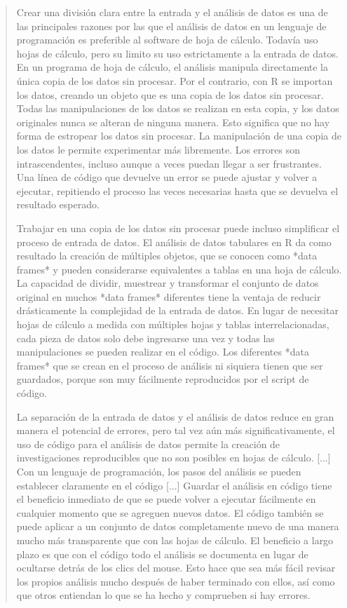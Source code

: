 \documentclass[
  letterpaper,
]{scrbook}
\begin{document}
\begin{quote}
Crear una división clara entre la entrada y el análisis de datos es una de las principales razones por las que el análisis de datos en un lenguaje de programación es preferible al software de hoja de cálculo. Todavía uso hojas de cálculo, pero su limito su uso estrictamente a la entrada de datos. En un programa de hoja de cálculo, el análisis manipula directamente la única copia de los datos sin procesar. Por el contrario, con R se importan los datos, creando un objeto que es una copia de los datos sin procesar. Todas las manipulaciones de los datos se realizan en esta copia, y los datos originales nunca se alteran de ninguna manera. Esto significa que no hay forma de estropear los datos sin procesar. La manipulación de una copia de los datos le permite experimentar más libremente. Los errores son intrascendentes, incluso aunque a veces puedan llegar a ser frustrantes. Una línea de código que devuelve un error se puede ajustar y volver a ejecutar, repitiendo el proceso las veces necesarias hasta que se devuelva el resultado esperado.

Trabajar en una copia de los datos sin procesar puede incluso simplificar el proceso de entrada de datos. El análisis de datos tabulares en R da como resultado la creación de múltiples objetos, que se conocen como *data frames* y pueden considerarse equivalentes a tablas en una hoja de cálculo. La capacidad de dividir, muestrear y transformar el conjunto de datos original en muchos *data frames* diferentes tiene la ventaja de reducir drásticamente la complejidad de la entrada de datos. En lugar de necesitar hojas de cálculo a medida con múltiples hojas y tablas interrelacionadas, cada pieza de datos solo debe ingresarse una vez y todas las manipulaciones se pueden realizar en el código. Los diferentes *data frames* que se crean en el proceso de análisis ni siquiera tienen que ser guardados, porque son muy fácilmente reproducidos por el script de código.

La separación de la entrada de datos y el análisis de datos reduce en gran manera el potencial de errores, pero tal vez aún más significativamente, el uso de código para el análisis de datos permite la creación de investigaciones reproducibles que no son posibles en hojas de cálculo. [...] Con un lenguaje de programación, los pasos del análisis se pueden establecer claramente en el código [...] Guardar el análisis en código tiene el beneficio inmediato de que se puede volver a ejecutar fácilmente en cualquier momento que se agreguen nuevos datos. El código también se puede aplicar a un conjunto de datos completamente nuevo de una manera mucho más transparente que con las hojas de cálculo. El beneficio a largo plazo es que con el código todo el análisis se documenta en lugar de ocultarse detrás de los clics del mouse. Esto hace que sea más fácil  revisar los propios análisis mucho después de haber terminado con ellos, así como que otros entiendan lo que se ha hecho y comprueben si hay errores.

\end{quote}
\end{document}
